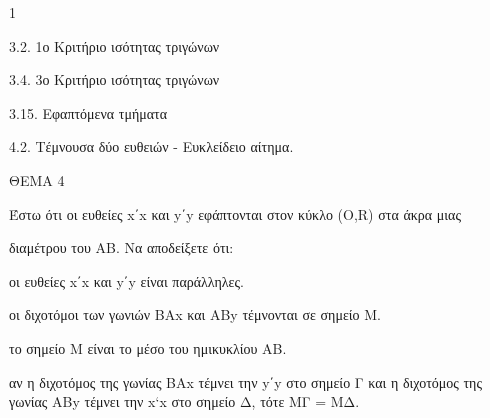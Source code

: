 \begin{ylh}{1}
    \item 3.2. 1ο Κριτήριο ισότητας τριγώνων
    \item 3.4. 3ο Κριτήριο ισότητας τριγώνων
    \item 3.15. Εφαπτόμενα τμήματα
    \item 4.2. Τέμνουσα δύο ευθειών - Ευκλείδειο αίτημα.
\end{ylh}

ΘΕΜΑ 4

Έστω ότι οι ευθείες x΄x και y΄y εφάπτονται στον κύκλο (Ο,R) στα άκρα μιας

διαμέτρου του ΑΒ. Να αποδείξετε ότι:

\begin{alist}
\item οι ευθείες x΄x και y΄y είναι παράλληλες. 

\item οι διχοτόμοι των γωνιών ΒΑx και ΑΒy τέμνονται σε σημείο Μ. 

\item το σημείο Μ είναι το μέσο του ημικυκλίου ΑΒ. 

\item αν η διχοτόμος της γωνίας ΒΑx τέμνει την y΄y στο σημείο Γ και η διχοτόμος της γωνίας ΑΒy τέμνει την x`x στο σημείο Δ, τότε ΜΓ = ΜΔ. 
\end{alist}

